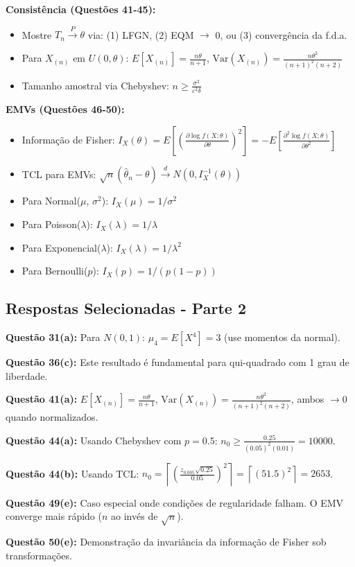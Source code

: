 \documentclass[12pt,a4paper]{article}
\begin{document}
\textbf{Consistência (Questões 41-45):}
\begin{itemize}
    \item Mostre $T_n \xrightarrow{P} \theta$ via: (1) LFGN, (2) EQM $\to$ 0, ou (3) convergência da f.d.a.
    \item Para $X_{(n)}$ em $U(0,\theta)$: $E[X_{(n)}] = \frac{n\theta}{n+1}$, $\text{Var}(X_{(n)}) = \frac{n\theta^2}{(n+1)^2(n+2)}$
    \item Tamanho amostral via Chebyshev: $n \geq \frac{\sigma^2}{\varepsilon^2 \delta}$
\end{itemize}

\textbf{EMVs (Questões 46-50):}
\begin{itemize}
    \item Informação de Fisher: $I_X(\theta) = E\left[\left(\frac{\partial \log f(X;\theta)}{\partial \theta}\right)^2\right] = -E\left[\frac{\partial^2 \log f(X;\theta)}{\partial \theta^2}\right]$
    \item TCL para EMVs: $\sqrt{n}(\hat{\theta}_n - \theta) \xrightarrow{d} N(0, I_X^{-1}(\theta))$
    \item Para Normal($\mu$, $\sigma^2$): $I_X(\mu) = 1/\sigma^2$
    \item Para Poisson($\lambda$): $I_X(\lambda) = 1/\lambda$
    \item Para Exponencial($\lambda$): $I_X(\lambda) = 1/\lambda^2$
    \item Para Bernoulli($p$): $I_X(p) = 1/(p(1-p))$
\end{itemize}

\subsection{Respostas Selecionadas - Parte 2}

\textbf{Questão 31(a):} Para $N(0,1)$: $\mu_4 = E[X^4] = 3$ (use momentos da normal).

\textbf{Questão 36(c):} Este resultado é fundamental para qui-quadrado com 1 grau de liberdade.

\textbf{Questão 41(a):} $E[X_{(n)}] = \frac{n\theta}{n+1}$, $\text{Var}(X_{(n)}) = \frac{n\theta^2}{(n+1)^2(n+2)}$, ambos $\to 0$ quando normalizados.

\textbf{Questão 44(a):} Usando Chebyshev com $p=0.5$: $n_0 \geq \frac{0.25}{(0.05)^2(0.01)} = 10000$.

\textbf{Questão 44(b):} Usando TCL: $n_0 = \left\lceil \left(\frac{z_{0.005}\sqrt{0.25}}{0.05}\right)^2 \right\rceil = \left\lceil (51.5)^2 \right\rceil = 2653$.

\textbf{Questão 49(e):} Caso especial onde condições de regularidade falham. O EMV converge mais rápido ($n$ ao invés de $\sqrt{n}$).

\textbf{Questão 50(e):} Demonstração da invariância da informação de Fisher sob transformações.
\end{document}

